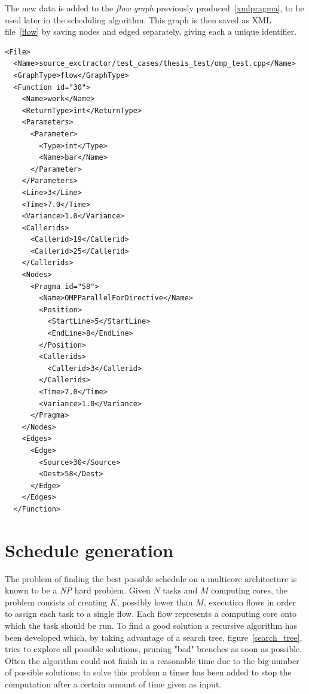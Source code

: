 \documentclass[a4paper,12pt,oneside]{book}
\begin{document}
The new data is added to the \emph{flow graph} previously produced~\ref{xmlpragma}, to be used later in the scheduling algorithm. This graph is then saved as XML file~\ref{flow} by saving nodes and edged separately, giving each a unique identifier. 


\lstset{language=XML}
\begin{lstlisting}[caption=Final XML \emph{flow graph}, label=flow]
<File>
  <Name>source_exctractor/test_cases/thesis_test/omp_test.cpp</Name>
  <GraphType>flow</GraphType>
  <Function id="30">
    <Name>work</Name>
    <ReturnType>int</ReturnType>
    <Parameters>
      <Parameter>
        <Type>int</Type>
        <Name>bar</Name>
      </Parameter>
    </Parameters>
    <Line>3</Line>
    <Time>7.0</Time>
    <Variance>1.0</Variance>
    <Callerids>
      <Callerid>19</Callerid>
      <Callerid>25</Callerid>
    </Callerids>
    <Nodes>
      <Pragma id="58">
        <Name>OMPParallelForDirective</Name>
        <Position>
          <StartLine>5</StartLine>
          <EndLine>8</EndLine>
        </Position>
        <Callerids>
          <Callerid>3</Callerid>
        </Callerids>
        <Time>7.0</Time>
        <Variance>1.0</Variance>
      </Pragma>
    </Nodes>
    <Edges>
      <Edge>
        <Source>30</Source>
        <Dest>58</Dest>
      </Edge>
    </Edges>
  </Function>
\end{lstlisting}


\section{Schedule generation}
\label{schedulegeneration}

The problem of finding the best possible schedule on a multicore architecture is known to be a \emph{NP} hard problem. Given $N$ tasks and $M$ computing cores, the problem consists of creating $K$, possibly lower than $M$, execution flows in order to assign each task to a single flow. Each flow represents a computing core onto which the task should be run. To find a good solution a recursive algorithm has been developed which, by taking advantage of a search tree, figure~\ref{search_tree}, tries to explore all possible solutions, pruning "bad" brenches as soon as possible. Often the algorithm could not finish in a reasonable time due to the big number of possible solutions; to solve this problem a timer has been added to stop the computation after a certain amount of time given as input. \\
\end{document}
